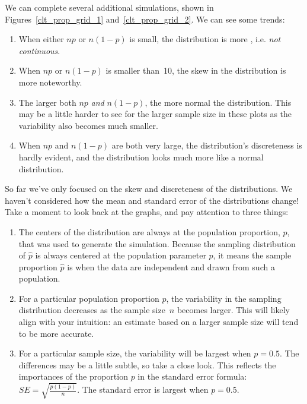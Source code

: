 


We can complete several additional simulations,
shown in
Figures~\ref{clt_prop_grid_1}
and~\ref{clt_prop_grid_2}.
We can see some trends:
\begin{enumerate}
\item When either $np$ or $n(1 - p)$ is small, the
    distribution is more ,
    i.e. \emph{not continuous}.
\item When $np$ or $n(1-p)$ is smaller than~10,
    the skew in the distribution is more noteworthy.
\item The larger both $np$ \emph{and} $n(1 - p)$,
    the more normal the distribution.
    This may be a little harder to see for the larger
    sample size in these plots as the variability
    also becomes much smaller.
\item When $np$ and $n(1 - p)$ are both very large,
    the distribution's discreteness is hardly evident,
    and the distribution looks much more
    like a normal distribution.
\end{enumerate}

So far we've only focused on the skew and discreteness
of the distributions. We haven't considered
how the mean and standard error
of the distributions change!
Take a moment to look back at the graphs,
and pay attention to three things:
\begin{enumerate}
\item The centers of the distribution are always at
    the population proportion, $p$, that was used to
    generate the simulation. Because the sampling
    distribution of $\hat{p}$ is always centered at
    the population parameter $p$, it means the sample
    proportion $\hat{p}$ is  when
    the data are independent and drawn from such
    a population.
\item For a particular population proportion $p$,
    the variability in the sampling distribution
    decreases as the sample size~$n$ becomes larger.
    This will likely align with your intuition:
    an estimate based on a larger sample size will
    tend to be more accurate.
\item For a particular sample size, the variability
    will be largest when $p = 0.5$. The differences
    may be a little subtle, so take a close look.
    This reflects the importances of the proportion
    $p$ in the standard error formula:
    $SE = \sqrt{\frac{p (1 - p)}{n}}$.
    The standard error is largest when $p = 0.5$.
\end{enumerate}

